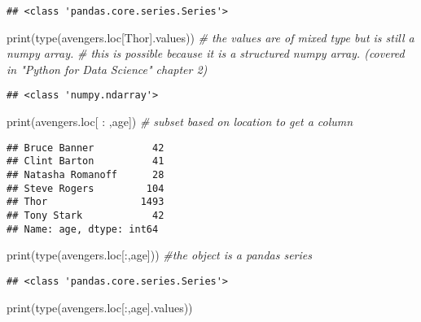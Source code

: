 \documentclass[
]{book}
\newenvironment{Shaded}{\begin{snugshade}}{\end{snugshade}}
\newcommand{\BuiltInTok}[1]{#1}
\newcommand{\CommentTok}[1]{\textcolor[rgb]{0.56,0.35,0.01}{\textit{#1}}}
\newcommand{\NormalTok}[1]{#1}
\newcommand{\StringTok}[1]{\textcolor[rgb]{0.31,0.60,0.02}{#1}}
\begin{document}
\begin{verbatim}
## <class 'pandas.core.series.Series'>
\end{verbatim}

\begin{Shaded}
\begin{Highlighting}[]
\BuiltInTok{print}\NormalTok{(}\BuiltInTok{type}\NormalTok{(avengers.loc[}\StringTok{\textquotesingle{}Thor\textquotesingle{}}\NormalTok{].values))  }\CommentTok{\# the values are of mixed type but is still a numpy array. }
\CommentTok{\# this is possible because it is a structured numpy array. (covered in "Python for Data Science" chapter 2)}
\end{Highlighting}
\end{Shaded}

\begin{verbatim}
## <class 'numpy.ndarray'>
\end{verbatim}

\begin{Shaded}
\begin{Highlighting}[]
\BuiltInTok{print}\NormalTok{(avengers.loc[ : ,}\StringTok{\textquotesingle{}age\textquotesingle{}}\NormalTok{]) }\CommentTok{\# subset based on location to get a column}
\end{Highlighting}
\end{Shaded}

\begin{verbatim}
## Bruce Banner          42
## Clint Barton          41
## Natasha Romanoff      28
## Steve Rogers         104
## Thor                1493
## Tony Stark            42
## Name: age, dtype: int64
\end{verbatim}

\begin{Shaded}
\begin{Highlighting}[]
\BuiltInTok{print}\NormalTok{(}\BuiltInTok{type}\NormalTok{(avengers.loc[:,}\StringTok{\textquotesingle{}age\textquotesingle{}}\NormalTok{]))  }\CommentTok{\#the object is a pandas series}
\end{Highlighting}
\end{Shaded}

\begin{verbatim}
## <class 'pandas.core.series.Series'>
\end{verbatim}

\begin{Shaded}
\begin{Highlighting}[]
\BuiltInTok{print}\NormalTok{(}\BuiltInTok{type}\NormalTok{(avengers.loc[:,}\StringTok{\textquotesingle{}age\textquotesingle{}}\NormalTok{].values))}
\end{Highlighting}
\end{Shaded}
\end{document}

